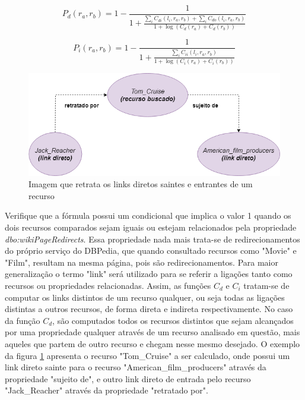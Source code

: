 \begin{equation}
	P_d(r_a, r_b) = 1 - \frac{1}{1 + \frac{\sum_i C_{di}(l_i, r_a, r_b) + \sum_i C_{do}(l_i, r_a, r_b)}{1 + \log (C_d(r_a) + C_d(r_b))}}
\label{eq:rlws_ex1}
\end{equation}

\begin{equation}
	P_i(r_a, r_b) = 1 - \frac{1}{1 + \frac{\sum_i C_{ii}(l_i, r_a, r_b)}{1 + \log (C_i(r_a) + C_i(r_b))}}
\label{eq:rlws_ex2}
\end{equation}

\begin{figure}
	\centering
	\includegraphics[scale=0.5]{imagens/cd_links.png}
	\caption{Imagem que retrata os links diretos saintes e entrantes de um recurso}
	\label{fig:cd_links}
\end{figure}

Verifique que a fórmula possui um condicional que implica o valor 1 quando os dois recursos comparados sejam iguais ou estejam relacionados pela propriedade \textit{dbo:wikiPageRedirects}. Essa propriedade nada mais trata-se de redirecionamentos do próprio serviço do DBPedia, que quando consultado recursos como "Movie" e "Film", resultam na mesma página, pois são redirecionamentos. Para maior generalização o termo "link" será utilizado para se referir a ligações tanto como recursos ou propriedades relacionadas. Assim, as funções $C_d$ e $C_i$ tratam-se de computar os links distintos de um recurso qualquer, ou seja todas as ligações distintas a outros recursos, de forma direta e indireta respectivamente. No caso da função $C_d$, são computados todos os recursos distintos que sejam alcançados por uma propriedade qualquer através de um recurso analisado em questão, mais aqueles que partem de outro recurso e chegam nesse mesmo desejado. O exemplo da figura \ref{fig:cd_links} apresenta o recurso "Tom\_Cruise" a ser calculado, onde possui um link direto sainte para o recurso "American\_film\_producers" através da propriedade "sujeito de", e outro link direto de entrada pelo recurso "Jack\_Reacher" através da propriedade "retratado por". 


